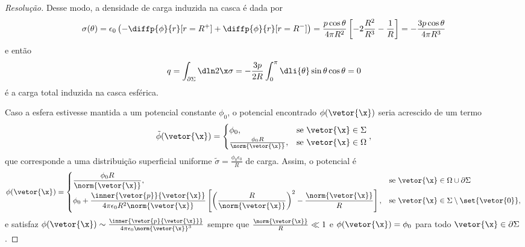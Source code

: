 \begin{proof}[Resolução]
    Desse modo, a densidade de carga induzida na casca é dada por
    \begin{equation*}
        \sigma(\theta) = \epsilon_0\left(-\diffp{\phi}{r}[r = R^+] + \diffp{\phi}{r}[r = R^-]\right) = \frac{p\cos\theta}{4\pi R^2} \left[-2\frac{R^2}{R^3} - \frac{1}{R}\right] = -\frac{3p \cos\theta}{4\pi R^3}
    \end{equation*}
    e então
    \begin{equation*}
        q = \int_{\partial \Sigma} \dln2{\x} \sigma = -\frac{3p}{2R}\int_0^\pi \dli{\theta} \sin\theta \cos\theta = 0
    \end{equation*}
    é a carga total induzida na casca esférica.

    Caso a esfera estivesse mantida a um potencial constante \(\phi_0\), o potencial encontrado \(\phi(\vetor{\x})\) seria acrescido de um termo
    \begin{equation*}
        \tilde{\phi}(\vetor{\x}) = \begin{cases}
            \phi_0, &\text{se }\vetor{\x} \in \Sigma\\
            \frac{\phi_0 R}{\norm{\vetor{\x}}}, &\text{se }\vetor{\x} \in \Omega
        \end{cases},
    \end{equation*}
    que corresponde a uma distribuição superficial uniforme \(\tilde{\sigma} = \frac{\phi_0 \epsilon_0}{R}\) de carga. Assim, o potencial é
    \begin{equation*}
        \phi(\vetor{\x}) = \begin{cases}
            \displaystyle \frac{\phi_0 R}{\norm{\vetor{\x}}},&\text{se } \vetor{\x} \in \Omega \cup \partial \Sigma\\
            \displaystyle \phi_0 + \frac{\inner{\vetor{p}}{\vetor{\x}}}{4\pi \epsilon_0 R^2 \norm{\vetor{\x}}}\left[\left(\frac{R}{\norm{\vetor{\x}}}\right)^2 - \frac{\norm{\vetor{\x}}}{R}\right],&\text{se }\vetor{\x} \in \Sigma \setminus\set{\vetor{0}},
        \end{cases}
    \end{equation*}
    e satisfaz \(\phi(\vetor{\x}) \sim \frac{\inner{\vetor{p}{\vetor{\x}}}}{4\pi \epsilon_0 \norm{\vetor{\x}}^3}\) sempre que \(\frac{\norm{\vetor{\x}}}{R} \ll 1\) e \(\phi(\vetor{\x}) = \phi_0\) para todo \(\vetor{\x} \in \partial \Sigma\).
\end{proof}

